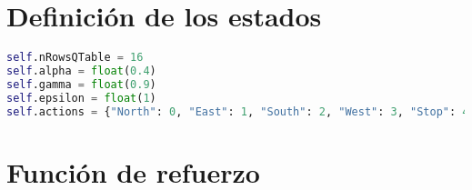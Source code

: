 \documentclass[11pt]{exam}
\begin{document}
\section{Definición de los estados}\label{estados}

\begin{lstlisting}[language=python, basicstyle=\footnotesize]
self.nRowsQTable = 16
self.alpha = float(0.4)
self.gamma = float(0.9)
self.epsilon = float(1)
self.actions = {"North": 0, "East": 1, "South": 2, "West": 3, "Stop": 4}	
\end{lstlisting}



\section{Función de refuerzo}\label{refuerzo}
\end{document}
